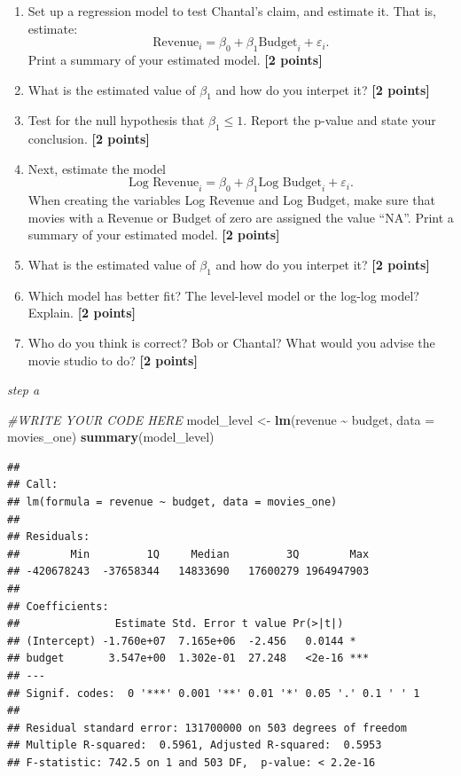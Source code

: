 \documentclass[
]{article}
\newenvironment{Shaded}{\begin{snugshade}}{\end{snugshade}}
\newcommand{\AttributeTok}[1]{\textcolor[rgb]{0.13,0.29,0.53}{#1}}
\newcommand{\CommentTok}[1]{\textcolor[rgb]{0.56,0.35,0.01}{\textit{#1}}}
\newcommand{\FunctionTok}[1]{\textcolor[rgb]{0.13,0.29,0.53}{\textbf{#1}}}
\newcommand{\NormalTok}[1]{#1}
\newcommand{\OtherTok}[1]{\textcolor[rgb]{0.56,0.35,0.01}{#1}}
\newcommand{\SpecialCharTok}[1]{\textcolor[rgb]{0.81,0.36,0.00}{\textbf{#1}}}
\providecommand{\tightlist}{%
  \setlength{\itemsep}{0pt}\setlength{\parskip}{0pt}}
\begin{document}
\begin{enumerate}
\def\labelenumi{\alph{enumi}.}
\tightlist
\item
  Set up a regression model to test Chantal's claim, and estimate it.
  That is, estimate:
  \[\text{Revenue}_i=\beta_0+\beta_1 \text{Budget}_i +\varepsilon_i.\]
  Print a summary of your estimated model. \textbf{[2 points]}
\item
  What is the estimated value of \(\beta_1\) and how do you interpet it?
  \textbf{[2 points]}
\item
  Test for the null hypothesis that \(\beta_1 \leq 1\). Report the
  p-value and state your conclusion. \textbf{[2 points]}
\item
  Next, estimate the model
  \[\text{Log Revenue}_i=\beta_0+\beta_1 \text{Log Budget}_i +\varepsilon_i.\]
  When creating the variables Log Revenue and Log Budget, make sure that
  movies with a Revenue or Budget of zero are assigned the value ``NA''.
  Print a summary of your estimated model. \textbf{[2 points]}
\item
  What is the estimated value of \(\beta_1\) and how do you interpet it?
  \textbf{[2 points]}
\item
  Which model has better fit? The level-level model or the log-log
  model? Explain. \textbf{[2 points]}
\item
  Who do you think is correct? Bob or Chantal? What would you advise the
  movie studio to do? \textbf{[2 points]}
\end{enumerate}

\emph{step a}

\begin{Shaded}
\begin{Highlighting}[]
\CommentTok{\#WRITE YOUR CODE HERE}
\NormalTok{model\_level }\OtherTok{\textless{}{-}} \FunctionTok{lm}\NormalTok{(revenue }\SpecialCharTok{\textasciitilde{}}\NormalTok{ budget, }\AttributeTok{data =}\NormalTok{ movies\_one)}
\FunctionTok{summary}\NormalTok{(model\_level)}
\end{Highlighting}
\end{Shaded}

\begin{verbatim}
## 
## Call:
## lm(formula = revenue ~ budget, data = movies_one)
## 
## Residuals:
##        Min         1Q     Median         3Q        Max 
## -420678243  -37658344   14833690   17600279 1964947903 
## 
## Coefficients:
##               Estimate Std. Error t value Pr(>|t|)    
## (Intercept) -1.760e+07  7.165e+06  -2.456   0.0144 *  
## budget       3.547e+00  1.302e-01  27.248   <2e-16 ***
## ---
## Signif. codes:  0 '***' 0.001 '**' 0.01 '*' 0.05 '.' 0.1 ' ' 1
## 
## Residual standard error: 131700000 on 503 degrees of freedom
## Multiple R-squared:  0.5961, Adjusted R-squared:  0.5953 
## F-statistic: 742.5 on 1 and 503 DF,  p-value: < 2.2e-16
\end{verbatim}
\end{document}
